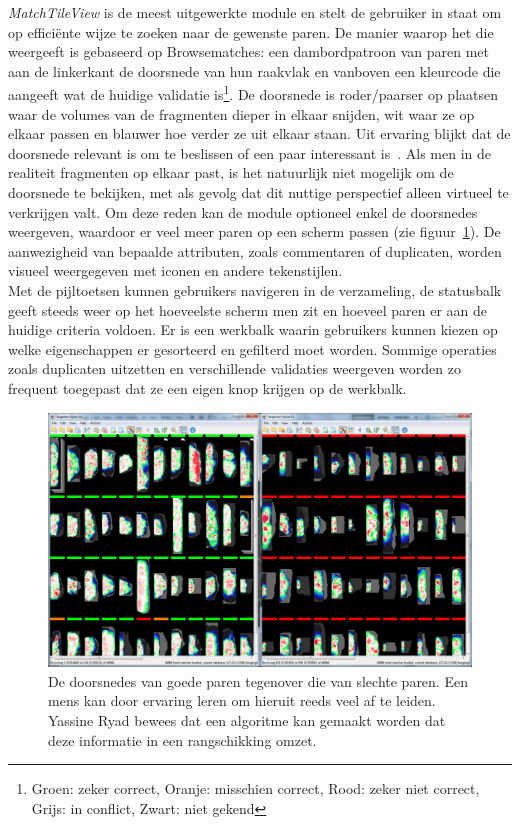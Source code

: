 \emph{MatchTileView} is de meest uitgewerkte module en stelt de gebruiker in staat om op effici\"ente wijze te zoeken naar de gewenste paren. De manier waarop het die weergeeft is gebaseerd op Browsematches: een dambordpatroon van paren met aan de linkerkant de doorsnede van hun raakvlak en vanboven een kleurcode die aangeeft wat de huidige validatie is\footnote{Groen: zeker correct, Oranje: misschien correct, Rood: zeker niet correct, Grijs: in conflict, Zwart: niet gekend}. De doorsnede is roder/paarser op plaatsen waar de volumes van de fragmenten dieper in elkaar snijden, wit waar ze op elkaar passen en blauwer hoe verder ze uit elkaar staan. Uit ervaring blijkt dat de doorsnede relevant is om te beslissen of een paar interessant is~\cite{Brown2010}. Als men in de realiteit fragmenten op elkaar past, is het natuurlijk niet mogelijk om de doorsnede te bekijken, met als gevolg dat dit nuttige perspectief alleen virtueel te verkrijgen valt. Om deze reden kan de module optioneel enkel de doorsnedes weergeven, waardoor er veel meer paren op een scherm passen (zie figuur~\ref{fig:tileview-reduced-compare}). De aanwezigheid van bepaalde attributen, zoals commentaren of duplicaten, worden visueel weergegeven met iconen en andere tekenstijlen.\\

Met de pijltoetsen kunnen gebruikers navigeren in de verzameling, de statusbalk geeft steeds weer op het hoeveelste scherm men zit en hoeveel paren er aan de huidige criteria voldoen. Er is een werkbalk waarin gebruikers kunnen kiezen op welke eigenschappen er gesorteerd en gefilterd moet worden. Sommige operaties zoals duplicaten uitzetten en verschillende validaties weergeven worden zo frequent toegepast dat ze een eigen knop krijgen op de werkbalk.\\

\begin{figure}[ht]
	\begin{center}
		\includegraphics[width=1.0\columnwidth]{images/tileview-reduced-compare-01.png}
		\caption{De doorsnedes van goede paren tegenover die van slechte paren. Een mens kan door ervaring leren om hieruit reeds veel af te leiden. Yassine Ryad bewees dat een algoritme kan gemaakt worden dat deze informatie in een rangschikking omzet.~\cite{Ryad2011}}
		\label{fig:tileview-reduced-compare}
	\end{center}
\end{figure}

